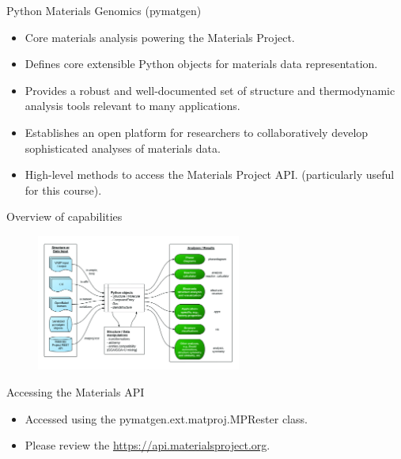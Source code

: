 \documentclass[aspectratio=169]{beamer}
\begin{document}
    \begin{frame}{Python Materials Genomics (pymatgen)}
        \begin{itemize}
            \item Core materials analysis powering the Materials Project.\cite{ongPythonMaterialsGenomics2013}
            \item Defines core extensible Python objects for materials data representation.
            \item Provides a robust and well-documented set of structure and thermodynamic analysis tools relevant to many applications.
            \item Establishes an open platform for researchers to collaboratively develop sophisticated analyses of materials data.
            \item High-level methods to access the Materials Project API.\cite{ongMaterialsApplicationProgramming2015} (particularly useful for this course).
        \end{itemize}
    \end{frame}


    \begin{frame}{Overview of capabilities}
        \begin{figure}
            \centering
            \includegraphics[width=0.6\textwidth]{figures/pymatgen-overview.jpg}
        \end{figure}
    \end{frame}


    \begin{frame}[fragile]{Accessing the Materials API}
        \begin{itemize}
            \item Accessed using the pymatgen.ext.matproj.MPRester class.
            \item Please review the \href{Materials API documentation}{https://api.materialsproject.org}.
            \inputminted{python}{code/example_materials_api.py}
        \end{itemize}
    \end{frame}
\end{document}
